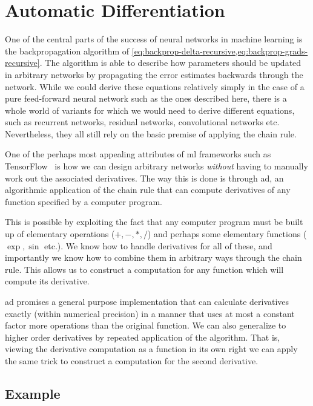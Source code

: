 \documentclass[Thesis.tex]{subfiles}
\begin{document}
\chapter{Automatic Differentiation}
\label{chp:auto-diff}

\glsresetall

One of the central parts of the success of neural networks in machine learning
is the backpropagation algorithm of
\cref{eq:backprop-delta-recursive,eq:backprop-grads-recursive}. The algorithm is able to
describe how parameters should be updated in arbitrary networks by propagating
the error estimates backwards through the network. While we could derive these
equations relatively simply in the case of a pure feed-forward neural network
such as the ones described here, there is a whole world of variants for which
we would need to derive different equations, such as recurrent networks,
residual networks, convolutional networks etc. Nevertheless, they all still rely
on the basic premise of applying the chain rule.

One of the perhaps most appealing attributes of \gls{ml} frameworks such as TensorFlow~\cite{tensorflow2015-whitepaper}
is how we can design arbitrary networks \emph{without} having to manually work
out the associated derivatives. The way this is done is through \gls{ad}, an
algorithmic application of the chain rule that can compute derivatives of any
function specified by a computer program.

This is possible by exploiting the fact that any computer program must be built
up of elementary operations (\(+,-,*,/\)) and perhaps some elementary functions
(\(\exp, \sin\) etc.). We know how to handle derivatives for all of these, and
importantly we know how to combine them in arbitrary ways through the chain
rule. This allows us to construct a computation for any function which
will compute its derivative.

\Gls{ad} promises a general purpose implementation that can
calculate derivatives exactly (within numerical precision) in a manner that uses
at most a constant factor more operations than the original function. We can
also generalize to higher order derivatives by repeated application of the
algorithm. That is, viewing the derivative computation as a function in its own
right we can apply the same trick to construct a computation for the second
derivative.


\section{Example}
\end{document}
